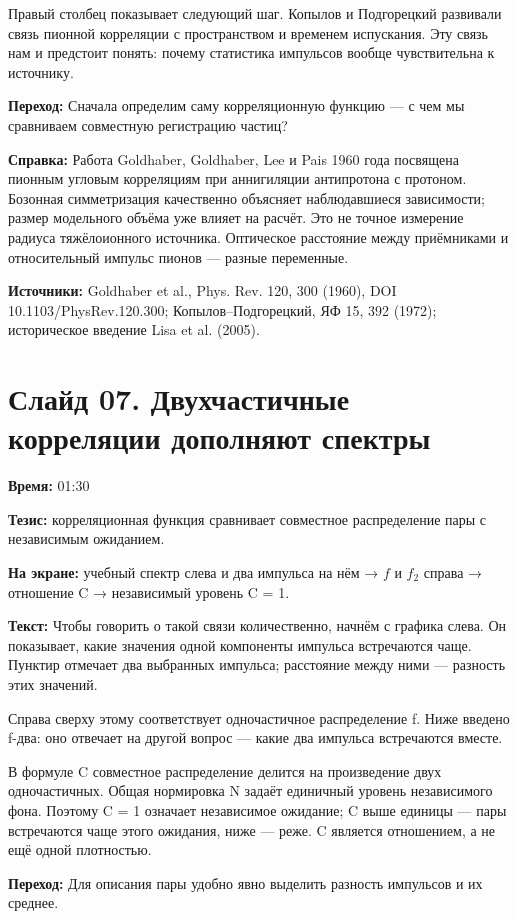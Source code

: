 \documentclass[11pt,a4paper]{article}
\begin{document}
Правый столбец показывает следующий шаг. Копылов и Подгорецкий развивали связь пионной корреляции с пространством и временем испускания. Эту связь нам и предстоит понять: почему статистика импульсов вообще чувствительна к источнику.

\textbf{Переход:} Сначала определим саму корреляционную функцию — с чем мы сравниваем совместную регистрацию частиц?

\textbf{Справка:} Работа Goldhaber, Goldhaber, Lee и Pais 1960 года посвящена пионным угловым корреляциям при аннигиляции антипротона с протоном. Бозонная симметризация качественно объясняет наблюдавшиеся зависимости; размер модельного объёма уже влияет на расчёт. Это не точное измерение радиуса тяжёлоионного источника. Оптическое расстояние между приёмниками и относительный импульс пионов — разные переменные.

\textbf{Источники:} Goldhaber et al., Phys. Rev. 120, 300 (1960), DOI 10.1103/PhysRev.120.300; Копылов–Подгорецкий, ЯФ 15, 392 (1972); историческое введение Lisa et al. (2005).

\clearpage
\section*{Слайд 07. Двухчастичные корреляции дополняют спектры}
\textbf{Время:} 01:30

\textbf{Тезис:} корреляционная функция сравнивает совместное распределение пары с независимым ожиданием.

\textbf{На экране:} учебный спектр слева и два импульса на нём → \(f\) и \(f_2\) справа → отношение C → независимый уровень C = 1.

\textbf{Текст:} Чтобы говорить о такой связи количественно, начнём с графика слева. Он показывает, какие значения одной компоненты импульса встречаются чаще. Пунктир отмечает два выбранных импульса; расстояние между ними — разность этих значений.

Справа сверху этому соответствует одночастичное распределение f. Ниже введено f-два: оно отвечает на другой вопрос — какие два импульса встречаются вместе.

В формуле C совместное распределение делится на произведение двух одночастичных. Общая нормировка N задаёт единичный уровень независимого фона. Поэтому C = 1 означает независимое ожидание; C выше единицы — пары встречаются чаще этого ожидания, ниже — реже. C является отношением, а не ещё одной плотностью.

\textbf{Переход:} Для описания пары удобно явно выделить разность импульсов и их среднее.
\end{document}
